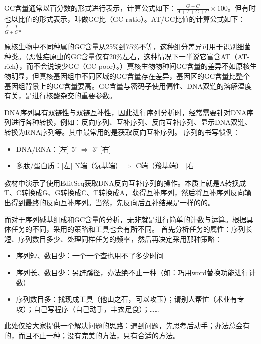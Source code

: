 GC含量通常以百分数的形式进行表示，计算公式如下：$\frac{G+C}{A+T+G+C}\times100$。但有时也以比值的形式表示，叫做GC比（GC-ratio）。AT/GC比值的计算公式如下：$\frac{A+T}{G+C}$。

原核生物中不同种属的GC含量从25\%到75\%不等，这种组分差异可用于识别细菌种类。（恶性疟原虫的GC含量仅有20\%左右，这种情况下一半说它富含AT（AT-rich），而不会说缺少GC（GC-poor）。）真核生物物种间GC含量的差异不如原核生物明显，但真核基因组中不同区域的GC含量存在差异，基因区的GC含量比整个基因组背景上的GC含量要高。GC含量与密码子使用偏性、DNA双链的溶解温度有关，是进行核酸杂交的重要参数。

DNA序列具有双链性与双链互补性，因此进行序列分析时，经常需要针对DNA序列进行各种转换，例如：反向序列、互补序列、反向互补序列、显示DNA双链、转换为RNA序列等。其中最常用的是获取反向互补序列。
序列的书写惯例：
\begin{itemize}
	\item DNA/RNA：[左] 5' $\Longrightarrow$ 3' [右]
	\item 多肽/蛋白质：[左] N端（氨基端）$\Longrightarrow$ C端（羧基端） [右]
\end{itemize}

教材中演示了使用EditSeq获取DNA反向互补序列的操作。本质上就是A转换成T、C转换成G、G转换成C、T转换成A，获得互补序列，然后将互补序列反向输出得到最终的反向互补序列。当然，先反向后互补结果是一样的的。

而对于序列碱基组成和GC含量的分析，无非就是进行简单的计数与运算。根据具体任务的不同，采用的策略和工具也会有所不同。
首先分析任务的属性：序列长短、序列数目多少、处理同样任务的频率，然后再决定采用那种策略：
\begin{itemize}
	\item 序列短、数目少：一个一个查也用不了多少时间
	\item 序列长、数目少：另辟蹊径，办法绝不止一种（如：巧用word替换功能进行计数）
	\item 序列数目多：找现成工具（他山之石，可以攻玉）；请别人帮忙（术业有专攻）；自己写程序（自己动手，丰衣足食）；……
\end{itemize}

此处仅给大家提供一个解决问题的思路：遇到问题，先思考后动手；办法总会有的，而且不止一种；没有完美的方法，只有合适的方法。

